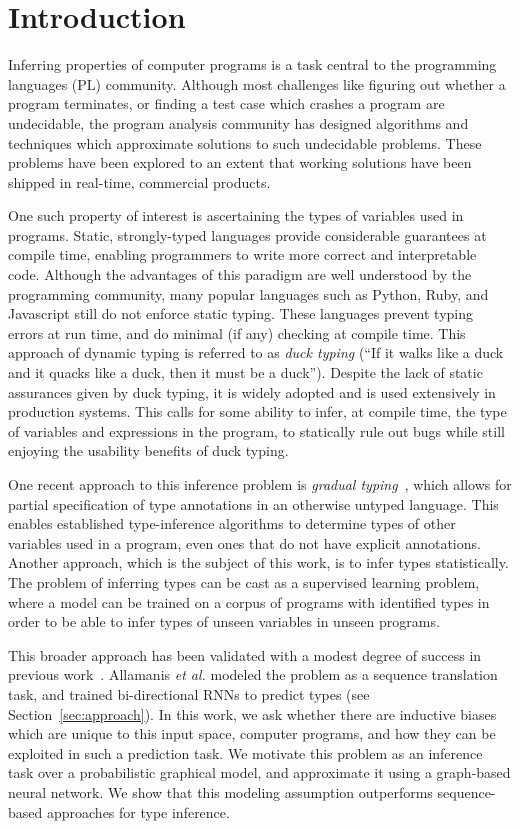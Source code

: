 \section{Introduction}
\label{sec:introduction}
Inferring properties of computer programs is a task central to the programming languages (PL) community.
Although most challenges like figuring out whether a program terminates, or finding a test case which crashes a program are undecidable, the program analysis community has designed algorithms and techniques which approximate solutions to such undecidable problems.
These problems have been explored to an extent that working solutions have been shipped in real-time, commercial products.

One such property of interest is ascertaining the types of variables used in programs.
Static, strongly-typed languages provide considerable guarantees at compile time, enabling programmers to write more correct and interpretable code.
Although the advantages of this paradigm are well understood by the programming community, many popular languages such as Python, Ruby, and Javascript still do not enforce static typing.
These languages prevent typing errors at run time, and do minimal (if any) checking at compile time.
This approach of dynamic typing is referred to as \textit{duck typing} (``If it walks like a duck and it quacks like a duck, then it must be a duck'').
Despite the lack of static assurances given by duck typing, it is widely adopted and is used extensively in production systems.
This calls for some ability to infer, at compile time, the type of variables and expressions in the program, to statically rule out bugs while still enjoying the usability benefits of duck typing.

One recent approach to this inference problem is \emph{gradual typing}~\cite{siek2006gradual}, which allows for partial specification of type annotations in an otherwise untyped language.
This enables established type-inference algorithms to determine types of other variables used in a program, even ones that do not have explicit annotations.
Another approach, which is the subject of this work, is to infer types statistically.
The problem of inferring types can be cast as a supervised learning problem, where a model can be trained on a corpus of programs with identified types in order to be able to infer types of unseen variables in unseen programs.

This broader approach has been validated with a modest degree of success in previous work~\cite{hellendoorn2018deep}.
Allamanis \textit{et al.} modeled the problem as a sequence translation task, and trained bi-directional RNNs to predict types (see Section~\ref{sec:approach}).
In this work, we ask whether there are inductive biases which are unique to this input space, computer programs, and how they can be exploited in such a prediction task.
We motivate this problem as an inference task over a probabilistic graphical model, and approximate it using a graph-based neural network.
We show that this modeling assumption outperforms sequence-based approaches for type inference.


